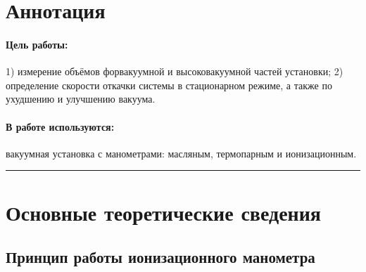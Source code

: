 \documentclass[a4paper,12pt]{report}
\begin{document}
	
	\newpage
    \pagestyle{fancy}

    \fancyhead{}
    \fancyfoot{}
    \fancyhead[L]{\rightmark}
    \fancyhead[R]{\thepage}

    \section*{Аннотация}
        \paragraph*{Цель работы:} 1) измерение объёмов форвакуумной и высоковакуумной частей установки; 2) определение скорости откачки системы в стационарном режиме, а также по ухудшению и улучшению вакуума.
        \paragraph*{В работе используются:} вакуумная установка с манометрами: масляным, термопарным и ионизационным.
    \vspace{0.5cm}
    \hrule

    \section{Основные теоретические сведения}

    \subsection{Принцип работы ионизационного манометра}
\end{document}
